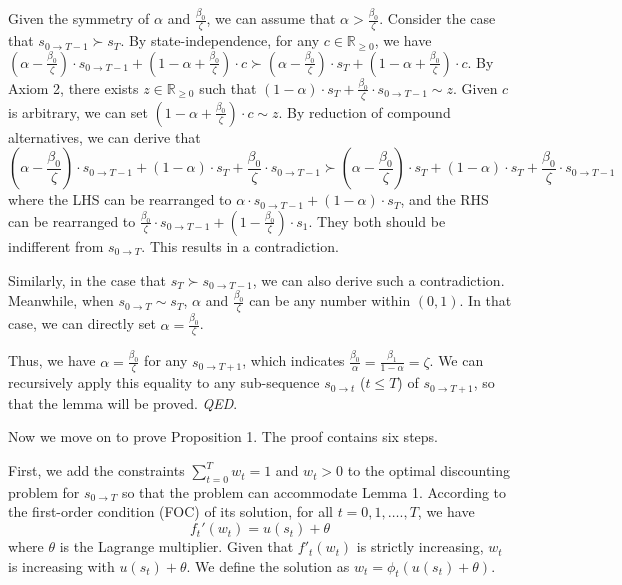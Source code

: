 \documentclass[
  12pt,
]{article}
\begin{document}
Given the symmetry of \(\alpha\) and \(\frac{\beta_0}{\zeta}\), we can
assume that \(\alpha > \frac{\beta_0}{\zeta}\). Consider the case that
\(s_{0 \rightarrow T-1} \succ s_T\). By state-independence, for any
\(c\in \mathbb{R}_{\geq 0}\), we have
\((\alpha - \frac{\beta_0}{\zeta})\cdot s_{0\rightarrow T-1} + (1-\alpha+\frac{\beta_0}{\zeta})\cdot c \succ (\alpha - \frac{\beta_0}{\zeta})\cdot s_T + (1-\alpha+\frac{\beta_0}{\zeta})\cdot c\).
By Axiom 2, there exists \(z\in \mathbb{R}_{\geq 0}\) such that
\((1-\alpha)\cdot s_T + \frac{\beta_0}{\zeta}\cdot s_{0\rightarrow T-1}\sim z\).
Given \(c\) is arbitrary, we can set
\((1-\alpha+\frac{\beta_0}{\zeta})\cdot c \sim z\). By reduction of
compound alternatives, we can derive that\[
(\alpha-\frac{\beta_0}{\zeta})\cdot s_{0\rightarrow T-1} +(1-\alpha)\cdot s_T + \frac{\beta_0}{\zeta}\cdot s_{0\rightarrow T-1} \succ (\alpha-\frac{\beta_0}{\zeta})\cdot s_T +(1-\alpha)\cdot s_T + \frac{\beta_0}{\zeta}\cdot s_{0\rightarrow T-1}
\]where the LHS can be rearranged to
\(\alpha\cdot s_{0\rightarrow T-1} + (1-\alpha)\cdot s_T\), and the RHS
can be rearranged to
\(\frac{\beta_0}{\zeta}\cdot s_{0 \rightarrow T-1} + (1-\frac{\beta_0}{\zeta})\cdot s_1\).
They both should be indifferent from \(s_{0\rightarrow T}\). This
results in a contradiction.

Similarly, in the case that \(s_T \succ s_{0 \rightarrow T-1}\), we can
also derive such a contradiction. Meanwhile, when
\(s_{0\rightarrow T}\sim s_T\), \(\alpha\) and \(\frac{\beta_0}{\zeta}\)
can be any number within \((0,1)\). In that case, we can directly set
\(\alpha = \frac{\beta_0}{\zeta}\).

Thus, we have \(\alpha = \frac{\beta_0}{\zeta}\) for any
\(s_{0\rightarrow T+1}\), which indicates
\(\frac{\beta_0}{\alpha}=\frac{\beta_1}{1-\alpha}=\zeta\). We can
recursively apply this equality to any sub-sequence
\(s_{0\rightarrow t}\) (\(t\leq T\)) of \(s_{0\rightarrow T+1}\), so
that the lemma will be proved. \emph{QED}.

Now we move on to prove Proposition 1. The proof contains six steps.

First, we add the constraints \(\sum_{t=0}^T w_t=1\) and \(w_t>0\) to
the optimal discounting problem for \(s_{0\rightarrow T}\) so that the
problem can accommodate Lemma 1. According to the first-order condition
(FOC) of its solution, for all \(t=0,1,….,T\), we have\[\tag{A3}
f_t'(w_t)=u(s_t)+\theta
\]where \(\theta\) is the Lagrange multiplier. Given that \(f'_t(w_t)\)
is strictly increasing, \(w_t\) is increasing with \(u(s_t)+\theta\). We
define the solution as \(w_t =\phi_t(u(s_t)+\theta)\).
\end{document}
